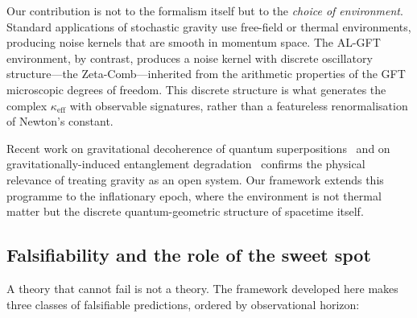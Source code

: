 \documentclass[12pt,a4paper]{article}
\begin{document}
Our contribution is not to the formalism itself but to the
\emph{choice of environment}.
Standard applications of stochastic gravity use free-field
or thermal environments, producing noise kernels that are
smooth in momentum space.
The AL-GFT environment, by contrast, produces a noise kernel
with discrete oscillatory structure---the
Zeta-Comb---inherited from the arithmetic properties of the
GFT microscopic degrees of freedom.
This discrete structure is what generates the complex
$\kappa_{\mathrm{eff}}$ with observable signatures, rather
than a featureless renormalisation of Newton's constant.

Recent work on gravitational decoherence of quantum
superpositions~\cite{Blencowe2013,Kanno2024} and on
gravitationally-induced entanglement
degradation~\cite{Anastopoulos2021} confirms the physical
relevance of treating gravity as an open system.
Our framework extends this programme to the inflationary
epoch, where the environment is not thermal matter but the
discrete quantum-geometric structure of spacetime itself.


\subsection{Falsifiability and the role of the sweet spot}
\label{subsec:falsifiability}

A theory that cannot fail is not a theory.
The framework developed here makes three classes of
falsifiable predictions, ordered by observational horizon:
\end{document}
